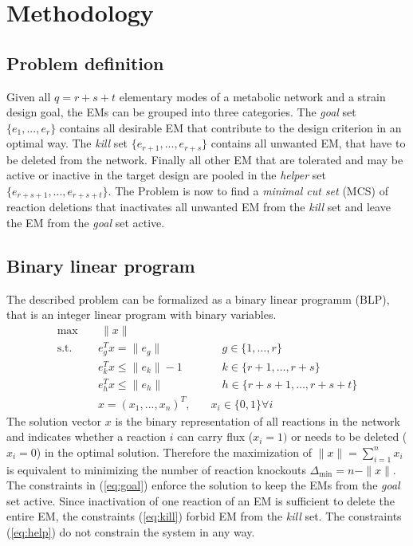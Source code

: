 \documentclass{llncs}
\begin{document}
\section{Methodology}
\subsection{Problem definition}
Given all $q = r+s+t$ elementary modes of a metabolic network and a strain design goal,
the EMs can be grouped into three categories.
The \emph{goal} set $\{e_{1}, ..., e_{r}\}$ contains all desirable EM that contribute 
to the design criterion in an optimal way.
The \emph{kill} set $\{e_{r+1}, ..., e_{r+s}\}$ contains all unwanted EM, 
that have to be deleted from the network.
Finally all other EM that are tolerated and may be active or inactive in 
the target design are pooled in the \emph{helper} set $\{e_{r+s+1}, ..., e_{r+s+t}\}$.
The Problem is now to find a \emph{minimal cut set} (MCS) of reaction deletions 
that inactivates all unwanted EM from the \emph{kill} set and leave the 
EM from the \emph{goal} set active.

\subsection{Binary linear program}
The described problem can be formalized as a binary linear programm (BLP), 
that is an integer linear program with binary variables.
\begin{subequations}
    \begin{align}
        \max \quad  & ~\|x\|    \label{eq:objfunc}\\
        \mbox{s.t.}\quad  & e^{T}_{g} x = \|e_{g}\| &\quad\quad g \in \{1, \dots, r\}   \label{eq:goal} \\
        & e^{T}_{k} x \leq \|e_{k}\|-1     &\quad\quad k \in \{r+1, \dots, r+s\}  \label{eq:kill} \\
        & e^{T}_{h} x \leq \|e_{h}\|       &\quad\quad h \in \{r+s+1, \dots, r+s+t\}  \label{eq:help} \\
        & x = (x_{1}, ..., x_{n})^{T}, &\quad x_{i} \in \{0, 1\} \forall i
        \end{align}
\end{subequations}
The solution vector $x$ is the binary representation of all reactions 
in the network and indicates whether a reaction
$i$ can carry flux ($x_{i} = 1)$ or needs to be deleted ($x_{i} = 0$) in
the optimal solution.
Therefore the maximization of $\|x\| = \sum_{i=1}^{n} x_{i}$ is equivalent
to minimizing the number of reaction knockouts $\Delta_{\min} = n - \|x\|$.
The constraints in (\ref{eq:goal}) enforce the solution to keep the 
EMs from the \emph{goal} set active. 
Since inactivation of one reaction of an EM is sufficient to delete the
entire EM, the constraints (\ref{eq:kill}) forbid EM from the \emph{kill} set.
The constraints (\ref{eq:help}) 
do not constrain the system in any way.
 
\end{document}
